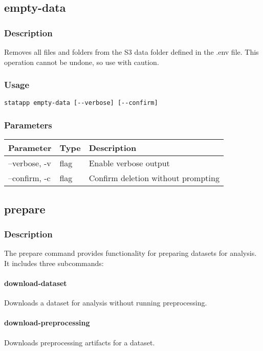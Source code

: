 \documentclass{article}
\begin{document}
\subsection{empty-data}
\subsubsection{Description}
Removes all files and folders from the S3 data folder defined in the .env file. This operation cannot be undone, so use with caution.

\subsubsection{Usage}
\begin{lstlisting}
statapp empty-data [--verbose] [--confirm]
\end{lstlisting}

\subsubsection{Parameters}
\begin{tabulary}{\linewidth}{LLL}
\toprule
\textbf{Parameter} & \textbf{Type} & \textbf{Description} \\
\midrule
--verbose, -v & flag & Enable verbose output \\
--confirm, -c & flag & Confirm deletion without prompting \\
\bottomrule
\end{tabulary}

\subsection{prepare}
\subsubsection{Description}
The prepare command provides functionality for preparing datasets for analysis. It includes three subcommands:

\paragraph{download-dataset}
Downloads a dataset for analysis without running preprocessing.

\paragraph{download-preprocessing}
Downloads preprocessing artifacts for a dataset.
\end{document}
